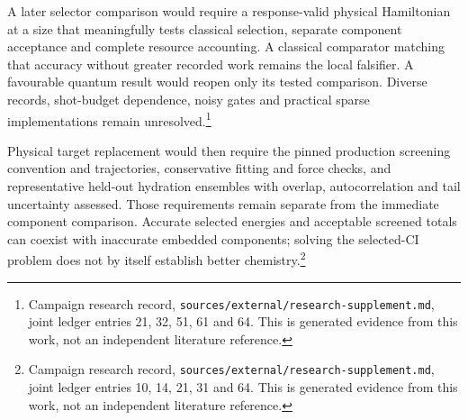 \documentclass{article}
\newcommand{\record}[1]{\footnote{Campaign research record, \texttt{sources/external/research-supplement.md}, #1. This is generated evidence from this work, not an independent literature reference.}}
\begin{document}
A later selector comparison would require a response-valid physical Hamiltonian at a size that meaningfully tests classical selection, separate component acceptance and complete resource accounting. A classical comparator matching that accuracy without greater recorded work remains the local falsifier. A favourable quantum result would reopen only its tested comparison. Diverse records, shot-budget dependence, noisy gates and practical sparse implementations remain unresolved.\record{joint ledger entries 21, 32, 51, 61 and 64}

Physical target replacement would then require the pinned production screening convention and trajectories, conservative fitting and force checks, and representative held-out hydration ensembles with overlap, autocorrelation and tail uncertainty assessed. Those requirements remain separate from the immediate component comparison. Accurate selected energies and acceptable screened totals can coexist with inaccurate embedded components; solving the selected-CI problem does not by itself establish better chemistry.\record{joint ledger entries 10, 14, 21, 31 and 64}



\end{document}
